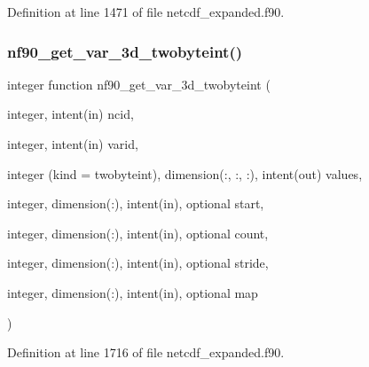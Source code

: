 Definition at line 1471 of file netcdf\+\_\+expanded.\+f90.

\mbox{\label{netcdf__expanded_8f90_aa8ce10a7f7f453d5e93ed43afed77d01}} 
\subsubsection{\texorpdfstring{nf90\+\_\+get\+\_\+var\+\_\+3d\+\_\+twobyteint()}{nf90\_get\_var\_3d\_twobyteint()}}
{\footnotesize\ttfamily integer function nf90\+\_\+get\+\_\+var\+\_\+3d\+\_\+twobyteint (\begin{DoxyParamCaption}\item[{integer, intent(in)}]{ncid,  }\item[{integer, intent(in)}]{varid,  }\item[{integer (kind = twobyteint), dimension(\+:, \+:, \+:), intent(out)}]{values,  }\item[{integer, dimension(\+:), intent(in), optional}]{start,  }\item[{integer, dimension(\+:), intent(in), optional}]{count,  }\item[{integer, dimension(\+:), intent(in), optional}]{stride,  }\item[{integer, dimension(\+:), intent(in), optional}]{map }\end{DoxyParamCaption})}



Definition at line 1716 of file netcdf\+\_\+expanded.\+f90.

\mbox{\label{netcdf__expanded_8f90_a49009223043fec3a6e56664363d34b28}} 
